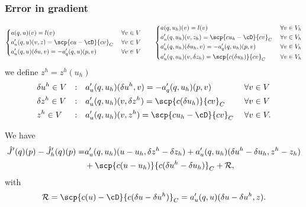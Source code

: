 \subsubsection{Error in gradient}
%
%
\begin{align*}
%
\left\{
\begin{aligned}
&a(q,u)(v) = l(v)&\; \forall v\in V\\
&a'_u(q,u)(v, z) = \scp{cu-\cD}{cv}_C&\; \forall v\in V\\
&a'_u(q,u)(\delta u,v) = -a'_q(q,u)(p,v)&\; \forall v\in V\\
\end{aligned}
\right.
%
\qquad
%
\left\{
\begin{aligned}
&a(q,u_h)(v) = l(v)&\; \forall v\in V_h\\
&a'_u(q,u_h)(v, z_h) = \scp{cu_h-\cD}{cv}_C&\; \forall v\in V_h\\
&a'_u(q,u_h)(\delta u_h,v) = -a'_q(q,u_h)(p,v)&\; \forall v\in V_h\\
&a'_u(q,u_h)(v,\delta z_h) = \scp{c(\delta u_h)}{cv}_C&\; \forall v\in V_h
\end{aligned}
\right.
%
\end{align*}
%
we define $z^h=z^h(u_h)$
%
\begin{alignat*}{3}
&\delta u^h\in V&:&\quad a'_u(q,u_h)(\delta u^h,v) = -a'_q(q,u_h)(p,v)\; &\forall& v\in V\\
&\delta z^h\in V&:&\quad a'_u(q,u_h)(v,\delta z^h) = \scp{c(\delta u_h)}{cv}_C\; &\forall& v\in V\\
&z^h\in V&:&\quad a'_u(q,u_h)(v, z^h) = \scp{cu_h-\cD}{cv}_C\; &\forall& v\in V.
\end{alignat*}
%
\begin{theorem}\label{thm:ErrorGradRep}
We have
%
\begin{equation}\label{eq:ErrorGradRep}
\begin{split}
\hat J'(q)(p) - \hat J_h'(q)(p) =& a'_u(q,u_h)(u-u_h,\delta z^{h}-\delta z_h) + a'_u(q,u_h)(\delta u^h-\delta u_h,z^h-z_h)\\
&+\scp{c(u-u_h)}{c(\delta u^h-\delta u_h)}_C + \mathcal R,
\end{split}
\end{equation}
%
with
%
\begin{equation}\label{eq:ErrorGradRemainder}
\mathcal R = \scp{c(u)-\cD}{c(\delta u-\delta u^h)}_C = a'_u(q,u)(\delta u-\delta u^h, z).
\end{equation}
%
\end{theorem}
